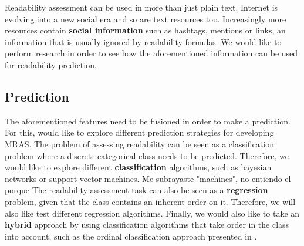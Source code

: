 \documentclass[12pt]{article}
\begin{document}
Readability assessment can be used in more than just plain text. Internet is evolving into a new social era and so are text resources too. Increasingly more resources contain \textbf{social information} such as hashtags, mentions or links, an information that is usually ignored by readability formulas. We would like to perform research in order to see how the aforementioned information can be used for readability prediction.




\subsection{Prediction}
The aforementioned features need to be fusioned in order to make a prediction.
For this, would like to explore different prediction strategies for developing MRAS. The problem of assessing readability can be seen as a classification problem where a discrete categorical class needs to be predicted. Therefore, we would like to  explore different \textbf{classification} algorithms, such as bayesian networks or support vector machines. {\color{red} Me subrayaste "machines", no entiendo el porque} The readability assessment task can also be seen as a \textbf{regression} problem, given that the class contains an inherent order on it. Therefore, we will also like test different regression algorithms. Finally, we would also like to take an \textbf{hybrid} approach by using classification algorithms that take order in the class into account, such as the ordinal classification approach presented in \cite{frank2001simple}.
\end{document}
